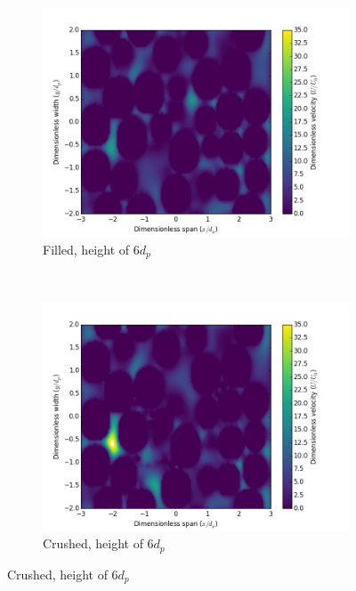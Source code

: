 \begin{figure}[!ht]
    \begin{subfigure}[b]{0.44\textwidth}
        \includegraphics[width = \textwidth]{figures/lbm/cross-sections-filled/contour-120}
        \caption{Filled, height of $6d_p$}\label{fig:lbm-contours-filled-120}
    \end{subfigure}
    ~
    \begin{subfigure}[b]{0.44\textwidth}
        \includegraphics[width = \textwidth]{figures/lbm/cross-sections-crushed/contour-120}
        \caption{Crushed, height of $6d_p$}\label{fig:lbm-contours-crushed-120}
    \end{subfigure}


\end{figure}
